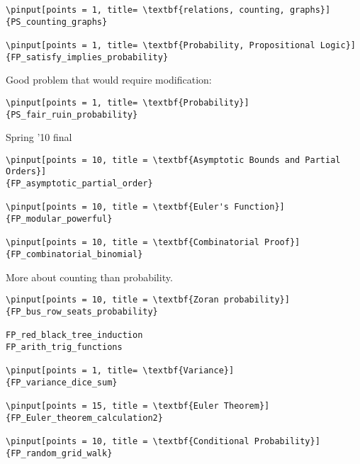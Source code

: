 \documentclass[quiz]{mcs}
\begin{document}
\begin{staffnotes}
\begin{verbatim}
\pinput[points = 1, title= \textbf{relations, counting, graphs}]
{PS_counting_graphs}

\pinput[points = 1, title= \textbf{Probability, Propositional Logic}]
{FP_satisfy_implies_probability}
\end{verbatim}

Good problem that would require modification:
\begin{verbatim}
\pinput[points = 1, title= \textbf{Probability}]
{PS_fair_ruin_probability}
\end{verbatim}

Spring '10 final

\begin{verbatim}
\pinput[points = 10, title = \textbf{Asymptotic Bounds and Partial Orders}]
{FP_asymptotic_partial_order}

\pinput[points = 10, title = \textbf{Euler's Function}]
{FP_modular_powerful}

\pinput[points = 10, title = \textbf{Combinatorial Proof}]
{FP_combinatorial_binomial}
\end{verbatim}

More about counting than probability.
\begin{verbatim}
\pinput[points = 10, title = \textbf{Zoran probability}]
{FP_bus_row_seats_probability}

FP_red_black_tree_induction
FP_arith_trig_functions

\pinput[points = 1, title= \textbf{Variance}]
{FP_variance_dice_sum}

\pinput[points = 15, title = \textbf{Euler Theorem}]
{FP_Euler_theorem_calculation2}

\pinput[points = 10, title = \textbf{Conditional Probability}]
{FP_random_grid_walk}

\end{verbatim}

\end{staffnotes}
\end{document}
